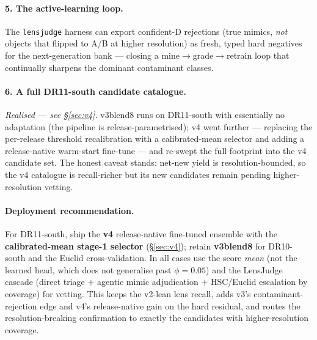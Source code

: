 \paragraph{5. The active-learning loop.} The \texttt{lensjudge} harness can export confident-D
rejections (true mimics, \emph{not} objects that flipped to A/B at higher resolution) as fresh,
typed hard negatives for the next-generation bank --- closing a mine$\to$grade$\to$retrain loop that
continually sharpens the dominant contaminant classes.

\paragraph{6. A full DR11-south candidate catalogue.} \emph{Realised --- see \S\ref{sec:v4}.} v3blend8
runs on DR11-south with essentially no adaptation (the pipeline is release-parametrised); v4 went
further --- replacing the per-release threshold recalibration with a calibrated-mean selector and adding
a release-native warm-start fine-tune --- and re-swept the full footprint into the v4 candidate set. The
honest caveat stands: net-new yield is resolution-bounded, so the v4 catalogue is recall-richer but its
new candidates remain pending higher-resolution vetting.

\paragraph{Deployment recommendation.} For DR11-south, ship the \textbf{v4} release-native fine-tuned
ensemble with the \textbf{calibrated-mean stage-1 selector} (\S\ref{sec:v4}); retain \textbf{v3blend8}
for DR10-south and the Euclid cross-validation. In all cases use the score \emph{mean} (not the learned
head, which does not generalise past $\phi{=}0.05$) and the LensJudge cascade (direct triage $+$ agentic
mimic adjudication $+$ HSC/Euclid escalation by coverage) for vetting. This keeps the v2-lean lens
recall, adds v3's contaminant-rejection edge and v4's release-native gain on the hard residual, and
routes the resolution-breaking confirmation to exactly the candidates with higher-resolution coverage.
